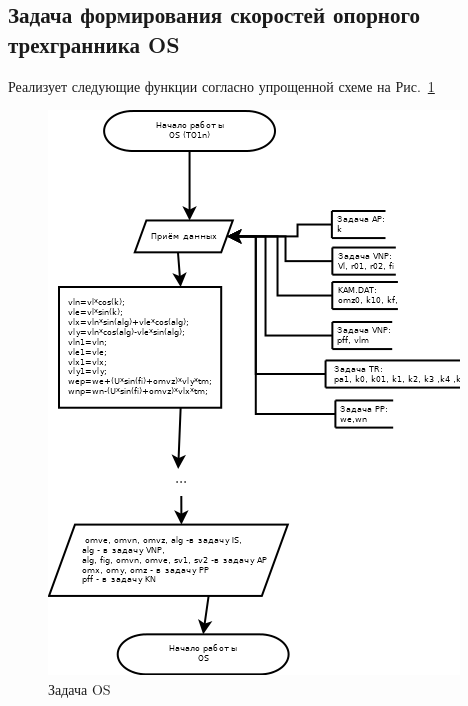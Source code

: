 \subsection{Задача формирования скоростей опорного трехгранника OS}
Реализует следующие функции согласно упрощенной схеме на Рис.~\ref{fig:OS}
\begin{figure}[H]
    \centering
    \includegraphics[width=0.8\linewidth]{images/OS_simple.png}
    \caption{Задача OS}
    \label{fig:OS}
\end{figure}
